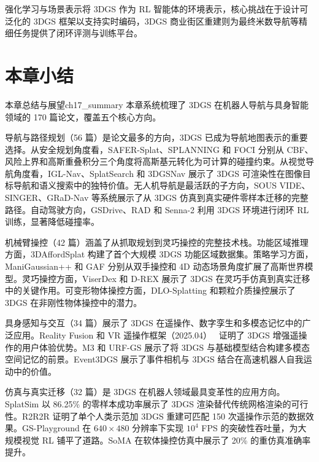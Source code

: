 \begin{takeaway}
强化学习与场景表示将 3DGS 作为 RL 智能体的环境表示，核心挑战在于设计可泛化的 3DGS 框架以支持实时编码，3DGS 商业街区重建则为最终米数导航等精细任务提供了闭环评测与训练平台。
\end{takeaway}




\section*{本章小结}
\label{sec:17_summary}

\begin{futurebox}{本章总结与展望}{ch17_summary}
本章系统梳理了 3DGS 在机器人导航与具身智能领域的 170 篇论文，覆盖五个核心方向。

导航与路径规划（56 篇）是论文最多的方向，3DGS 已成为导航地图表示的重要选择。从安全规划角度看，SAFER-Splat、SPLANNING 和 FOCI 分别从 CBF、风险上界和高斯重叠积分三个角度将高斯基元转化为可计算的碰撞约束。从视觉导航角度看，IGL-Nav、SplatSearch 和 3DGSNav 展示了 3DGS 可渲染性在图像目标导航和语义搜索中的独特价值。无人机导航是最活跃的子方向，SOUS VIDE、SINGER、GRaD-Nav 等系统展示了从 3DGS 仿真到真实硬件零样本迁移的完整路径。自动驾驶方向，GSDrive、RAD 和 Senna-2 利用 3DGS 环境进行闭环 RL 训练，显著降低碰撞率。

机械臂操控（42 篇）涵盖了从抓取规划到灵巧操控的完整技术栈。功能区域推理方面，3DAffordSplat 构建了首个大规模 3DGS 功能区域数据集。策略学习方面，ManiGaussian++ 和 GAF 分别从双手操控和 4D 动态场景角度扩展了高斯世界模型。灵巧操控方面，ViserDex 和 D-REX 展示了 3DGS 在灵巧手仿真到真实迁移中的关键作用。可变形物体操控方面，DLO-Splatting 和颗粒介质操控展示了 3DGS 在非刚性物体操控中的潜力。

具身感知与交互（34 篇）展示了 3DGS 在遥操作、数字孪生和多模态记忆中的广泛应用。Reality Fusion 和 VR 遥操作框架（2025.04）~\cite{2504_15229} 证明了 3DGS 增强遥操作的用户体验优势。M3 和 URF-GS 展示了将 3DGS 与基础模型结合构建多模态空间记忆的前景。Event3DGS 展示了事件相机与 3DGS 结合在高速机器人自我运动中的价值。

仿真与真实迁移（32 篇）是 3DGS 在机器人领域最具变革性的应用方向。SplatSim 以 86.25\% 的零样本成功率展示了 3DGS 渲染替代传统网格渲染的可行性。R2R2R 证明了单个人类示范加 3DGS 重建可匹配 150 次遥操作示范的数据效果。GS-Playground 在 $640\times480$ 分辨率下实现 $10^4$ FPS 的突破性吞吐量，为大规模视觉 RL 铺平了道路。SoMA 在软体操控仿真中展示了 20\% 的重仿真准确率提升。


\end{futurebox}
